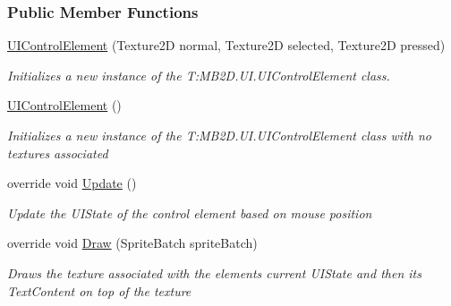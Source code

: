 \subsubsection*{Public Member Functions}
\begin{DoxyCompactItemize}
\item 
\hyperlink{class_m_b2_d_1_1_u_i_1_1_u_i_control_element_a5a0efcc50372be5e932eafeb13574a98}{U\+I\+Control\+Element} (Texture2D normal, Texture2D selected, Texture2D pressed)
\begin{DoxyCompactList}\small\item\em Initializes a new instance of the T\+:\+M\+B2\+D.\+U\+I.\+U\+I\+Control\+Element class. \end{DoxyCompactList}\item 
\hyperlink{class_m_b2_d_1_1_u_i_1_1_u_i_control_element_a7d846b2bfa9085ebb012663d75912fc1}{U\+I\+Control\+Element} ()
\begin{DoxyCompactList}\small\item\em Initializes a new instance of the T\+:\+M\+B2\+D.\+U\+I.\+U\+I\+Control\+Element class with no textures associated \end{DoxyCompactList}\item 
override void \hyperlink{class_m_b2_d_1_1_u_i_1_1_u_i_control_element_aa43f7ea6155de3086efbf29396ea2ccf}{Update} ()
\begin{DoxyCompactList}\small\item\em Update the U\+I\+State of the control element based on mouse position \end{DoxyCompactList}\item 
override void \hyperlink{class_m_b2_d_1_1_u_i_1_1_u_i_control_element_afac0cbbbbead7c7348401075cda433ba}{Draw} (Sprite\+Batch sprite\+Batch)
\begin{DoxyCompactList}\small\item\em Draws the texture associated with the elements current U\+I\+State and then its Text\+Content on top of the texture \end{DoxyCompactList}\end{DoxyCompactItemize}
